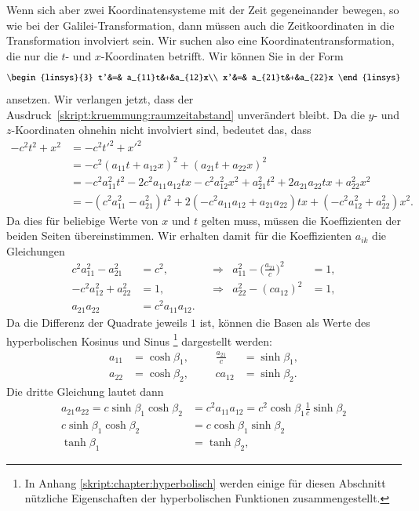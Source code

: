Wenn sich aber zwei Koordinatensysteme mit der Zeit gegeneinander bewegen,
so wie bei der Galilei-Transformation, dann müssen auch die
Zeitkoordinaten in die Transformation involviert sein.
Wir suchen also eine Koordinatentransformation, die nur die
$t$- und $x$-Koordinaten betrifft.
Wir können Sie in der Form
\begin{equation}
\begin{linsys}{3}
t'&=& a_{11}t&+&a_{12}x\\
x'&=& a_{21}t&+&a_{22}x
\end{linsys}
\end{equation}
ansetzen.
Wir verlangen jetzt, dass der
Ausdruck~\eqref{skript:kruemmung:raumzeitabstand}
unverändert bleibt.
Da die $y$- und $z$-Koordinaten ohnehin nicht involviert sind, bedeutet
das, dass
\begin{align*}
-c^2t^2 + x^2
&=
-c^2t'^2 + x'^2
\\
&=
-c^2(a_{11}t+a_{12}x)^2 + (a_{21}t+a_{22}x)^2
\\
&=
-c^2a_{11}^2t^2 -2c^2a_{11}a_{12}tx -c^2a_{12}^2x^2
+a_{21}^2t^2+2a_{21}a_{22}tx+a_{22}^2x^2
\\
&=
-(c^2a_{11}^2 - a_{21}^2)t^2
+2(-c^2a_{11}a_{12}+a_{21}a_{22})tx
+(-c^2a_{12}^2 + a_{22}^2)x^2.
\end{align*}
Da dies für beliebige Werte von $x$ und $t$ gelten muss, müssen die
Koeffizienten der beiden Seiten übereinstimmen. 
Wir erhalten damit für die Koeffizienten $a_{ik}$ die Gleichungen
\[
\begin{aligned}
c^2a_{11}^2-a_{21}^2&=c^2,
&&\Rightarrow&
a_{11}^2
-
\biggl(\frac{a_{21}}{c}\biggr)^2
&=1,
\\
-c^2a_{12}^2+a_{22}^2&=1,
&&\Rightarrow
&
a_{22}^2 - (ca_{12})^2&=1,
\\
a_{21}a_{22}&=c^2a_{11}a_{12}.
\end{aligned}
\]
Da die Differenz der Quadrate jeweils $1$ ist, können die Basen
als Werte des hyperbolischen Kosinus und Sinus%
\footnote{In Anhang \ref{skript:chapter:hyperbolisch} werden einige für
diesen Abschnitt nützliche Eigenschaften der hyperbolischen Funktionen
zusammengestellt.}
dargestellt werden:
\[
\begin{aligned}
a_{11}&=\cosh\beta_1, &&&\frac{a_{21}}{c}&=\sinh\beta_1,
\\
a_{22}&=\cosh\beta_2,&&&ca_{12}&=\sinh\beta_2.
\end{aligned}
\]
Die dritte Gleichung lautet dann
\begin{align*}
a_{21}a_{22}=c\sinh\beta_1\cosh\beta_2
&=
c^2a_{11}a_{12}=c^2\cosh\beta_1\frac1c\sinh\beta_2
\\
c\sinh\beta_1\cosh\beta_2
&=
c\cosh\beta_1\sinh\beta_2
\\
\tanh\beta_1&=\tanh\beta_2,
\end{align*}
